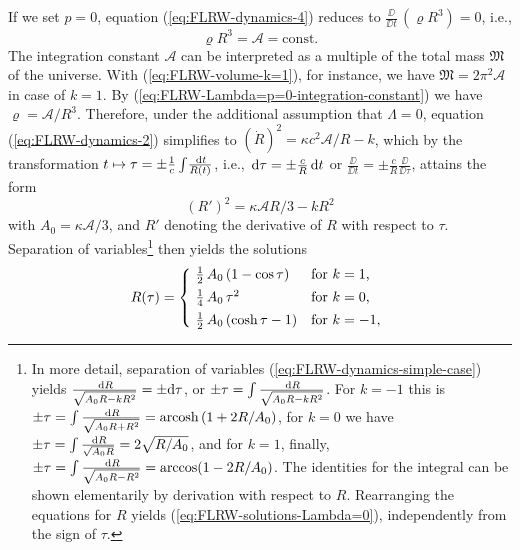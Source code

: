 If we set $p=0$, equation (\ref{eq:FLRW-dynamics-4})
reduces to 
$\frac{\DD}{\DD t} \, (\varrho R^3) = 0$, i.e., 
\begin{equation}
	\varrho R^3 = \mathscr{A} = \mathrm{const}
	.
	\label{eq:FLRW-Lambda=p=0-integration-constant}
\end{equation}
The integration constant $\mathscr{A}$ can be interpreted as a multiple of the total mass $\mathfrak{M}$ of the universe. With (\ref{eq:FLRW-volume-k=1}), for instance, we have $\mathfrak{M} = 2 \pi^2 \mathscr{A}$ in case of $k=1$.
By (\ref{eq:FLRW-Lambda=p=0-integration-constant}) we have $\varrho = \mathscr{A}/R^3$.
Therefore, under the additional assumption that $\Lambda = 0$, equation (\ref{eq:FLRW-dynamics-2}) simplifies to
$(\dot{R})^2 = {\kappa c^2 \mathscr{A}}/{R} - k$, which by the transformation $t \mapsto \tau = \pm \frac{1}{c}\int \! \frac{\,\mathrm{d} t}{R(t)}$,
i.e., $\,\mathrm{d} \tau = \pm \frac{c}{R} \,\mathrm{d} t$ or $\frac{\DD}{\DD t} = \pm \frac{c}{R} \frac{\DD}{\DD \tau}$, 
attains the form
\begin{equation}
	(R')^2 = \kappa \mathscr{A} R / 3 - k R^2
	\label{eq:FLRW-dynamics-simple-case}
\end{equation}
with $A_0 = \kappa \mathscr{A}/3$, and $R'$ denoting the derivative of $R$ with respect to $\tau$. \cite[237]{Stephani-1991}
Separation of variables\footnote{
	In more detail, %
	separation of variables (\ref{eq:FLRW-dynamics-simple-case})
	yields
	$
		\frac{\,\mathrm{d} R}{\sqrt{A_0 R - k R^2}} = \pm\!\,\mathrm{d} \tau
	$,
	or
	$\pm\tau = \int \frac{\,\mathrm{d} R}{\sqrt{A_0 R - k R^2}}$.
	For $k=-1$ this is 
	$\pm\tau 
	= \int \frac{\,\mathrm{d} R}{\sqrt{A_0 R + R^2}}
	= \mathrm{arcosh}\, (1 + 2R/A_0)
	$,
	for $k=0$ we have 
	$\pm\tau 
	= \int \frac{\,\mathrm{d} R}{\sqrt{A_0 R}}
	= 2 \sqrt{R/A_0}
	$,
	and for $k=1$, finally,
	$\pm\tau 
	= \int \frac{\,\mathrm{d} R}{\sqrt{A_0 R - R^2}}
	= \arccos (1 - 2R/A_0)
	$.
	The identities for the integral can be shown elementarily by derivation with respect to $R$.
	Rearranging the equations for $R$ yields (\ref{eq:FLRW-solutions-Lambda=0}), independently from the sign of $\tau$.
}
then yields the solutions
\begin{equation}
	R(\tau) = \left\{ \begin{array}{@{\ }ll}
		\frac{1}{2}\, A_0 \, (1 - \cos \tau) & \mbox{for $k = 1$,}
		\\[1.0ex]
		\frac{1}{4}\, A_0 \, \tau^2 & \mbox{for $k = 0$,}
		\\[1.0ex]
		\frac{1}{2}\, A_0 \, (\cosh \tau - 1) & \mbox{for $k = -1$,}
	\end{array}\right.
	\label{eq:FLRW-solutions-Lambda=0} %
\end{equation}
